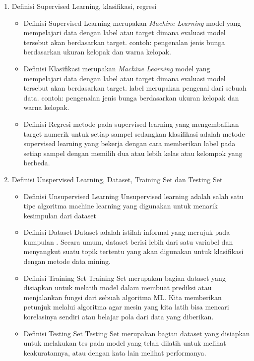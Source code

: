 \begin{enumerate}
	\begin{enumerate}
	\item Definisi Supervised Learning, klasifikasi, regresi
		\begin{itemize}
		\item Definisi Supervised Learning
		\newline merupakan \emph{Machine Learning}  model yang mempelajari data dengan label atau target dimana evaluasi model tersebut akan berdasarkan target. contoh: pengenalan jenis bunga berdasarkan ukuran kelopak dan warna kelopak.
		\item Definisi Klasifikasi
		\newline merupakan \emph{Machine Learning}  model yang mempelajari data dengan label atau target dimana evaluasi model tersebut akan berdasarkan target. label merupakan pengenal dari sebuah data. contoh: pengenalan jenis bunga berdasarkan ukuran kelopak dan warna kelopak.
		\item Definisi Regresi
		\newline metode pada supervised learning yang mengembalikan target numerik untuk setiap sampel sedangkan klasifikasi adalah metode supervised learning yang bekerja dengan cara memberikan label pada setiap sampel dengan memilih dua atau lebih kelas atau kelompok yang berbeda.
		\end{itemize}
	\item Definisi Unspervised Learning, Dataset, Training Set dan Testing Set
		\begin{itemize}
		\item Definisi Unsupervised Learning
		\newline Unsupervised learning adalah salah satu tipe algoritma machine learning yang digunakan untuk menarik kesimpulan dari dataset
		\item Definisi Dataset
		\newline Dataset adalah istilah informal yang merujuk pada kumpulan . Secara umum, dataset berisi lebih dari satu variabel dan menyangkut suatu topik tertentu yang akan digunakan untuk klasifikasi dengan metode data mining. 
		\item Definisi Training Set
		\newline Training Set merupakan bagian dataset yang disiapkan untuk melatih model dalam membuat prediksi atau menjalankan fungsi dari sebuah algoritma ML. Kita memberikan petunjuk melalui algoritma agar mesin yang kita latih bisa mencari korelasinya sendiri atau belajar pola dari data yang diberikan.
		\item Definisi Testing Set
		\newline Testing Set merupakan bagian dataset yang disiapkan untuk melakukan tes pada model yang telah dilatih untuk melihat keakuratannya, atau dengan kata lain melihat performanya.
		\end{itemize}
	\end{enumerate}
\end{enumerate}

